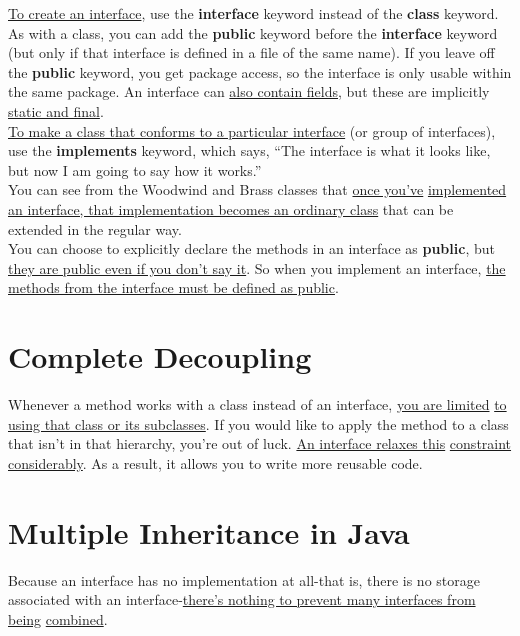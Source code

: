 \documentclass[10pt,letterpaper]{report}
\begin{document}
\underline{To create an interface}, use the \textbf{interface} keyword instead of the \textbf{class} keyword. As with a class, you can add the \textbf{public} keyword before the \textbf{interface} keyword (but only if that interface is defined in a file of the same name). If you leave off the \textbf{public} keyword, you get package access, so the interface is only usable within the same package. An interface can \underline{also contain fields}, but these are implicitly \underline{static and final}.\\

\underline{To make a class that conforms to a particular interface} (or group of interfaces), use the \textbf{implements} keyword, which says, ``The interface is what it looks like, but now I am going to say how it works.''\\

You can see from the Woodwind and Brass classes that \underline{once you've} \underline{implemented} \underline{an interface, that implementation becomes an ordinary class} that can be extended in the regular way.\\

You can choose to explicitly declare the methods in an interface as \textbf{public}, but \underline{they are public even if you don't say it}. So when you implement an interface, \underline{the methods from the interface must be defined as public}.
\section{Complete Decoupling}
Whenever a method works with a class instead of an interface, \underline{you are limited} \underline{to using that class or its subclasses}. If you would like to apply the method to a class that isn't in that hierarchy, you're out of luck. \underline{An interface relaxes this} \underline{constraint considerably}. As a result, it allows you to write more reusable code.
\section{Multiple Inheritance in Java}
Because an interface has no implementation at all-that is, there is no storage associated with an interface-\underline{there's nothing to prevent many interfaces from} \underline{being} \underline{combined}.\\
\end{document}
